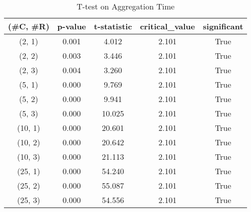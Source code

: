 \begin{table}
\centering
\caption{T-test on Aggregation Time}
\label{tab:t-testAggregating}
\begin{tabular}{|c|c|c|c|c|}
\toprule
(\#C, \#R) &  p-value &  t-statistic &  critical\_value &  significant \\
\midrule
  (2, 1) &    0.001 &        4.012 &           2.101 &         True \\
  (2, 2) &    0.003 &        3.446 &           2.101 &         True \\
  (2, 3) &    0.004 &        3.260 &           2.101 &         True \\
  (5, 1) &    0.000 &        9.769 &           2.101 &         True \\
  (5, 2) &    0.000 &        9.941 &           2.101 &         True \\
  (5, 3) &    0.000 &       10.025 &           2.101 &         True \\
 (10, 1) &    0.000 &       20.601 &           2.101 &         True \\
 (10, 2) &    0.000 &       20.642 &           2.101 &         True \\
 (10, 3) &    0.000 &       21.113 &           2.101 &         True \\
 (25, 1) &    0.000 &       54.240 &           2.101 &         True \\
 (25, 2) &    0.000 &       55.087 &           2.101 &         True \\
 (25, 3) &    0.000 &       54.556 &           2.101 &         True \\
\bottomrule
\end{tabular}
\end{table}
